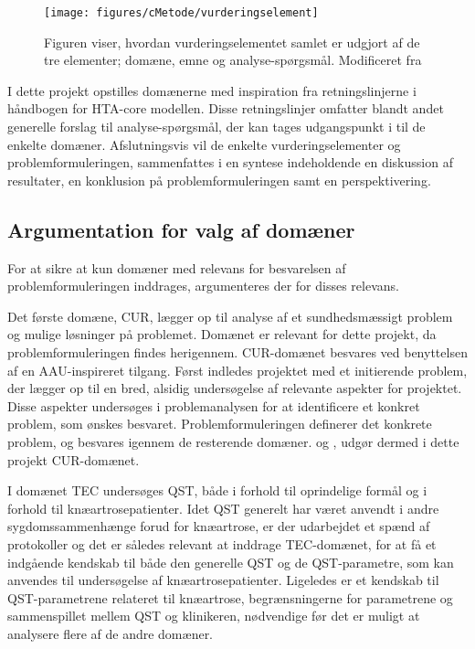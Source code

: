 \begin{figure}[H] 
\begin{center}
\texttt{[image: figures/cMetode/vurderingselement]}
\end{center}
\caption{Figuren viser, hvordan vurderingselementet samlet er udgjort af de tre elementer; domæne, emne og analyse-spørgsmål. Modificeret fra }
\label{fig:vurderingselement} 
\end{figure}

I dette projekt opstilles domænerne med inspiration fra retningslinjerne i håndbogen for HTA-core modellen. Disse retningslinjer omfatter blandt andet generelle forslag til analyse-spørgsmål, der kan tages udgangspunkt i til de enkelte domæner. Afslutningsvis vil de enkelte vurderingselementer og problemformuleringen, sammenfattes i en syntese indeholdende en diskussion af resultater, en konklusion på problemformuleringen samt en perspektivering. 

\subsection{Argumentation for valg af domæner}
For at sikre at kun domæner med relevans for besvarelsen af problemformuleringen inddrages, argumenteres der for disses relevans. 

Det første domæne, CUR, lægger op til analyse af et sundhedsmæssigt problem og mulige løsninger på problemet. Domænet er relevant for dette projekt, da problemformuleringen findes herigennem. CUR-domænet besvares ved benyttelsen af en AAU-inspireret tilgang. Først indledes projektet med et initierende problem, der lægger op til en bred, alsidig undersøgelse af relevante aspekter for projektet. Disse aspekter undersøges i problemanalysen for at identificere et konkret problem, som ønskes besvaret. Problemformuleringen definerer det konkrete problem, og besvares igennem de resterende domæner.  og , udgør dermed i dette projekt CUR-domænet. 

I domænet TEC undersøges QST, både i forhold til oprindelige formål og i forhold til knæartrosepatienter. Idet QST generelt har været anvendt i andre sygdomssammenhænge forud for knæartrose, er der udarbejdet et spænd af protokoller og det er således relevant at inddrage TEC-domænet, for at få et indgående kendskab til både den generelle QST og de QST-parametre, som kan anvendes til undersøgelse af knæartrosepatienter. Ligeledes er et kendskab til QST-parametrene relateret til knæartrose, begrænsningerne for parametrene og sammenspillet mellem QST og klinikeren, nødvendige før det er muligt at analysere flere af de andre domæner. 


